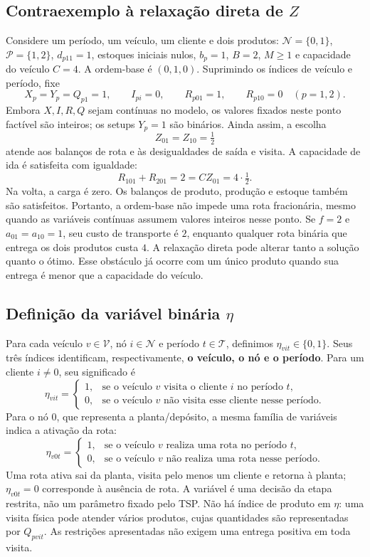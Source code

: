 \documentclass[11pt,a4paper]{article}
\newcommand{\N}{\mathcal{N}}
\newcommand{\Pset}{\mathcal{P}}
\newcommand{\Tset}{\mathcal{T}}
\newcommand{\Vset}{\mathcal{V}}
\begin{document}
\subsection{Contraexemplo à relaxação direta de $Z$}

Considere um período, um veículo, um cliente e dois produtos: $\N=\{0,1\}$, $\Pset=\{1,2\}$, $d_{p11}=1$, estoques iniciais nulos, $b_p=1$, $B=2$, $M\ge1$ e capacidade do veículo $C=4$. A ordem-base é $(0,1,0)$. Suprimindo os índices de veículo e período, fixe
\[
 X_p=Y_p=Q_{p1}=1,\qquad I_{pi}=0,\qquad
 R_{p01}=1,\qquad R_{p10}=0 \quad(p=1,2).
\]
Embora $X,I,R,Q$ sejam contínuas no modelo, os valores fixados neste ponto factível são inteiros; os setups $Y_p=1$ são binários. Ainda assim, a escolha
\[
 Z_{01}=Z_{10}=\tfrac12
\]
atende aos balanços de rota e às desigualdades de saída e visita. A capacidade de ida é satisfeita com igualdade:
\[
 R_{101}+R_{201}=2=CZ_{01}=4\cdot\tfrac12.
\]
Na volta, a carga é zero. Os balanços de produto, produção e estoque também são satisfeitos. Portanto, a ordem-base não impede uma rota fracionária, mesmo quando as variáveis contínuas assumem valores inteiros nesse ponto. Se $f=2$ e $a_{01}=a_{10}=1$, seu custo de transporte é $2$, enquanto qualquer rota binária que entrega os dois produtos custa $4$. A relaxação direta pode alterar tanto a solução quanto o ótimo. Esse obstáculo já ocorre com um único produto quando sua entrega é menor que a capacidade do veículo.

\subsection{Definição da variável binária $\eta$}
\label{sec:eta-definition}

Para cada veículo $v\in\Vset$, nó $i\in\N$ e período $t\in\Tset$, definimos $\eta_{vit}\in\{0,1\}$. Seus três índices identificam, respectivamente, \textbf{o veículo, o nó e o período}. Para um cliente $i\ne0$, seu significado é
\[
 \eta_{vit}=\begin{cases}
 1, & \text{se o veículo $v$ visita o cliente $i$ no período $t$},\\
 0, & \text{se o veículo $v$ não visita esse cliente nesse período}.
 \end{cases}
\]
Para o nó $0$, que representa a planta/depósito, a mesma família de variáveis indica a ativação da rota:
\[
 \eta_{v0t}=\begin{cases}
 1, & \text{se o veículo $v$ realiza uma rota no período $t$},\\
 0, & \text{se o veículo $v$ não realiza uma rota nesse período}.
 \end{cases}
\]
Uma rota ativa sai da planta, visita pelo menos um cliente e retorna à planta; $\eta_{v0t}=0$ corresponde à ausência de rota. A variável é uma decisão da etapa restrita, não um parâmetro fixado pelo TSP. Não há índice de produto em $\eta$: uma visita física pode atender vários produtos, cujas quantidades são representadas por $Q_{pvit}$. As restrições apresentadas não exigem uma entrega positiva em toda visita.
\end{document}
